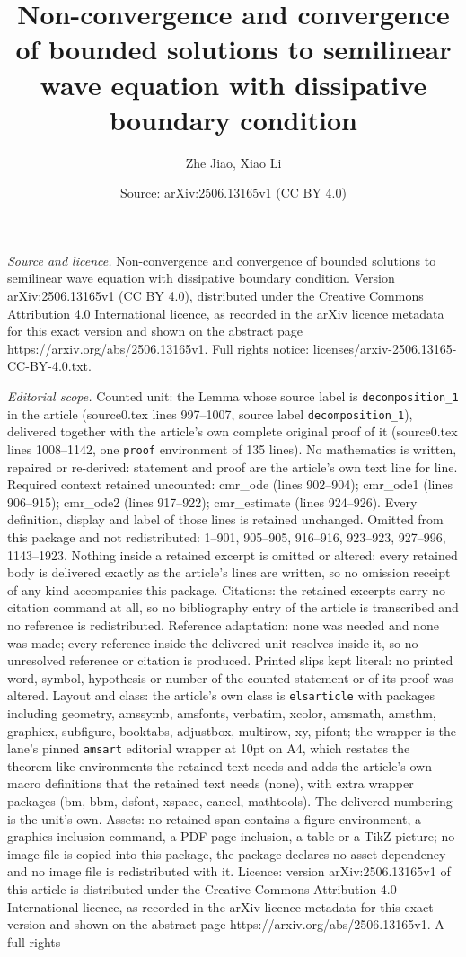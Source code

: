 \documentclass[10pt,a4paper]{amsart}
\title[Non-convergence and convergence of bounded solutions to semi]{Non-convergence and convergence of bounded solutions to semilinear wave equation with dissipative boundary condition}
\author{Zhe Jiao, Xiao Li}
\date{Source: arXiv:2506.13165v1 (CC BY 4.0)}
\begin{document}
\maketitle

\noindent\emph{Source and licence.} Non-convergence and convergence of bounded solutions to semilinear wave equation with dissipative boundary condition. Version arXiv:2506.13165v1 (CC BY 4.0), distributed under the Creative Commons Attribution 4.0 International licence, as recorded in the arXiv licence metadata for this exact version and shown on the abstract page https://arxiv.org/abs/2506.13165v1. Full rights notice: licenses/arxiv-2506.13165-CC-BY-4.0.txt.\par\smallskip

\noindent\textit{Editorial scope.} Counted unit: the Lemma whose source label is \texttt{decomposition\_1} in the article (source0.tex lines 997--1007, source label \texttt{decomposition\_1}), delivered together with the article's own complete original proof of it (source0.tex lines 1008--1142, one \texttt{proof} environment of 135 lines). No mathematics is written, repaired or re-derived: statement and proof are the article's own text line for line. Required context retained uncounted: cmr\_ode (lines 902--904); cmr\_ode1 (lines 906--915); cmr\_ode2 (lines 917--922); cmr\_estimate (lines 924--926). Every definition, display and label of those lines is retained unchanged. Omitted from this package and not redistributed: 1--901, 905--905, 916--916, 923--923, 927--996, 1143--1923. Nothing inside a retained excerpt is omitted or altered: every retained body is delivered exactly as the article's lines are written, so no omission receipt of any kind accompanies this package. Citations: the retained excerpts carry no citation command at all, so no bibliography entry of the article is transcribed and no reference is redistributed. Reference adaptation: none was needed and none was made; every reference inside the delivered unit resolves inside it, so no unresolved reference or citation is produced. Printed slips kept literal: no printed word, symbol, hypothesis or number of the counted statement or of its proof was altered. Layout and class: the article's own class is \texttt{elsarticle} with packages including geometry, amssymb, amsfonts, verbatim, xcolor, amsmath, amsthm, graphicx, subfigure, booktabs, adjustbox, multirow, xy, pifont; the wrapper is the lane's pinned \texttt{amsart} editorial wrapper at 10pt on A4, which restates the theorem-like environments the retained text needs and adds the article's own macro definitions that the retained text needs (none), with extra wrapper packages (bm, bbm, dsfont, xspace, cancel, mathtools). The delivered numbering is the unit's own. Assets: no retained span contains a figure environment, a graphics-inclusion command, a PDF-page inclusion, a table or a TikZ picture; no image file is copied into this package, the package declares no asset dependency and no image file is redistributed with it. Licence: version arXiv:2506.13165v1 of this article is distributed under the Creative Commons Attribution 4.0 International licence, as recorded in the arXiv licence metadata for this exact version and shown on the abstract page https://arxiv.org/abs/2506.13165v1. A full rights 
\end{document}
